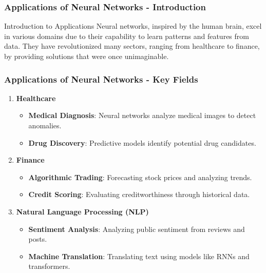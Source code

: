 \documentclass[aspectratio=169]{beamer}
\begin{document}
\begin{frame}[fragile]
    \frametitle{Applications of Neural Networks - Introduction}
    \begin{block}{Introduction to Applications}
        Neural networks, inspired by the human brain, excel in various domains due to their capability to learn patterns and features from data. 
        They have revolutionized many sectors, ranging from healthcare to finance, by providing solutions that were once unimaginable.
    \end{block}
\end{frame}

\begin{frame}[fragile]
    \frametitle{Applications of Neural Networks - Key Fields}
    \begin{enumerate}
        \item \textbf{Healthcare}
        \begin{itemize}
            \item \textbf{Medical Diagnosis}: Neural networks analyze medical images to detect anomalies.
            \item \textbf{Drug Discovery}: Predictive models identify potential drug candidates.
        \end{itemize}
        \item \textbf{Finance}
        \begin{itemize}
            \item \textbf{Algorithmic Trading}: Forecasting stock prices and analyzing trends.
            \item \textbf{Credit Scoring}: Evaluating creditworthiness through historical data.
        \end{itemize}
        \item \textbf{Natural Language Processing (NLP)}
        \begin{itemize}
            \item \textbf{Sentiment Analysis}: Analyzing public sentiment from reviews and posts.
            \item \textbf{Machine Translation}: Translating text using models like RNNs and transformers.
        \end{itemize}
    \end{enumerate}
\end{frame}
\end{document}
